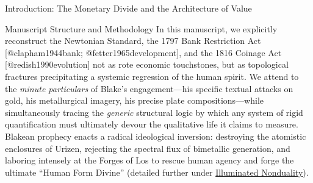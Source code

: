 \documentclass[
  ignorenonframetext,
]{beamer}
\begin{document}
\begin{frame}{Introduction: The Monetary Divide and the Architecture of
Value}
\begin{block}{Manuscript Structure and Methodology}
\protect{}\label{manuscript-structure-and-methodology}
In this manuscript, we explicitly reconstruct the Newtonian Standard,
the 1797 Bank Restriction Act {[}@clapham1944bank;
@fetter1965development{]}, and the 1816 Coinage Act
{[}@redish1990evolution{]} not as rote economic touchstones, but as
topological fractures precipitating a systemic regression of the human
spirit. We attend to the \emph{minute particulars} of Blake's
engagement---his specific textual attacks on gold, his metallurgical
imagery, his precise plate compositions---while simultaneously tracing
the \emph{generic} structural logic by which any system of rigid
quantification must ultimately devour the qualitative life it claims to
measure. Blakean prophecy enacts a radical ideological inversion:
destroying the atomistic enclosures of Urizen, rejecting the spectral
flux of bimetallic generation, and laboring intensely at the Forges of
Los to rescue human agency and forge the ultimate ``Human Form Divine''
(detailed further under
\href{04a_illuminated_nonduality.md\#illuminated-nonduality-and-the-fourfold-vision}{Illuminated
Nonduality}).


\end{block}
\end{frame}
\end{document}
